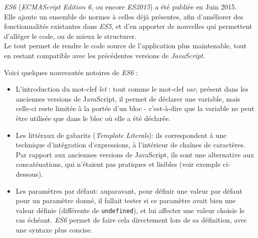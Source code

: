 \documentclass[12pt,a4paper]{article}
\newenvironment{Shaded}{}{}
\newcommand{\KeywordTok}[1]{\textcolor[rgb]{0.00,0.44,0.13}{\textbf{{#1}}}}
\newcommand{\SpecialCharTok}[1]{\textcolor[rgb]{0.25,0.44,0.63}{{#1}}}
\newcommand{\StringTok}[1]{\textcolor[rgb]{0.25,0.44,0.63}{{#1}}}
\newcommand{\VerbatimStringTok}[1]{\textcolor[rgb]{0.25,0.44,0.63}{{#1}}}
\newcommand{\CommentTok}[1]{\textcolor[rgb]{0.38,0.63,0.69}{\textit{{#1}}}}
\newcommand{\OperatorTok}[1]{\textcolor[rgb]{0.40,0.40,0.40}{{#1}}}
\newcommand{\NormalTok}[1]{{#1}}
\begin{document}
  \bigskip

  \emph{ES6} (\emph{ECMAScript Edition 6}, ou encore \emph{ES2015}) a été
  publiée en Juin 2015.\\
  Elle ajoute un ensemble de normes à celles déjà présentes, afin
  d'améliorer des fonctionnalités existantes dans \emph{ES5}, et d'en
  apporter de nouvelles qui permettent d'alléger le code, ou de mieux le
  structurer.\\
  Le tout permet de rendre le code source de l'application plus
  maintenable, tout en restant compatible avec les précédentes versions de
  \emph{JavaScript}.

  \bigskip

  Voici quelques nouveautés notoires de \emph{ES6} :

  \begin{itemize}
  \item
    L'introduction du mot-clef \emph{let} : tout comme le mot-clef
    \emph{var}, présent dans les anciennes versions de JavaScript, il
    permet de déclarer une variable, mais celle-ci reste limitée à la
    portée d'un bloc - c'est-à-dire que la variable ne peut être utilisée
    que dans le bloc où elle a été déclarée.
  \item
    Les littéraux de gabarits (\emph{Template Literals}): ils
    correspondent à une technique d'intégration d'expressions, à
    l'intérieur de chaînes de caractères. Par rapport aux anciennes
    versions de JavaScript, ils sont une alternative aux concaténations,
    qui n'étaient pas pratiques et lisibles (voir exemple ci-dessous).

  \begin{Shaded}
  \end{Shaded}
  \item
    Les paramètres par défaut: auparavant, pour définir une valeur par
    défaut pour un paramètre donné, il fallait tester si ce paramètre
    avait bien une valeur définie (différente de \texttt{undefined}), et
    lui affecter une valeur choisie le cas échéant. \emph{ES6} permet de
    faire cela directement lors de sa définition, avec une syntaxe plus
    concise.


\end{itemize}
\end{document}
